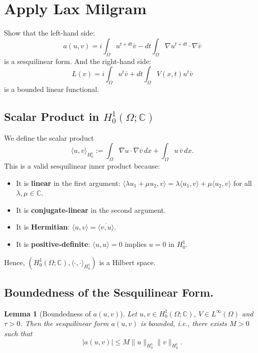 \documentclass{article}
\theoremstyle{definition}
\theoremstyle{plain}
\newtheorem{lemma}[definition]{Lemma}
\theoremstyle{remark}
\begin{document}
\section{Apply Lax Milgram}
Show that the left-hand side: $$a(u,v) = i \int_{\Omega} u^{t + dt} \bar{v} - dt \int_{\Omega} \nabla u^{t + dt} \cdot \nabla \bar{v}$$ is a sesquilinear form.
And the right-hand side: $$L(v) = i \int_{\Omega} u^t \bar{v} + dt \int_{\Omega} V(x,t) u^t \bar{v}$$ is a bounded linear functional.
\subsection{Scalar Product in $H_0^1(\Omega; \mathbb{C})$}
We define the scalar product
\[
\langle u, v \rangle_{H_0^1} := \int_\Omega \nabla u \cdot \nabla \overline{v} \, dx + \int_\Omega u \, \overline{v} \, dx.
\]
This is a valid sesquilinear inner product because:
\begin{itemize}
  \item It is \textbf{linear} in the first argument: $\langle \lambda u_1 + \mu u_2, v \rangle = \lambda \langle u_1, v \rangle + \mu \langle u_2, v \rangle$ for all $\lambda, \mu \in \mathbb{C}$.
  \item It is \textbf{conjugate-linear} in the second argument.
  \item It is \textbf{Hermitian}: $\langle u, v \rangle = \overline{\langle v, u \rangle}$.
  \item It is \textbf{positive-definite}: $\langle u, u \rangle = 0$ implies $u = 0$ in $H_0^1$.
\end{itemize}
Hence, $(H_0^1(\Omega; \mathbb{C}), \langle \cdot, \cdot \rangle_{H_0^1})$ is a Hilbert space.

\subsection{Boundedness of the Sesquilinear Form.}
\begin{lemma}[Boundedness of $a(u, v)$]
Let $u, v \in H_0^1(\Omega; \mathbb{C})$, $V \in L^\infty(\Omega)$ and $\tau > 0$. Then the sesquilinear form $a(u, v)$ is bounded, i.e., there exists $M > 0$ such that
\[
|a(u, v)| \leq M \|u\|_{H_0^1} \|v\|_{H_0^1}.
\]
\end{lemma}
\end{document}
